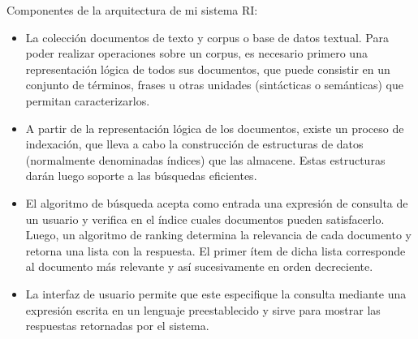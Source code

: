 \documentclass[11pt]{exam}
\begin{document}
\begin{questions}
Componentes de la arquitectura de mi sistema RI:

\begin{itemize}
	\item La colección documentos de texto y corpus o base de datos textual. Para poder realizar operaciones sobre un corpus, es necesario primero una representación lógica de todos sus documentos, que puede consistir en un conjunto de términos, frases u otras unidades (sintácticas o semánticas) que permitan caracterizarlos.
	\item A partir de la representación lógica de los documentos, existe un proceso de indexación, que lleva a cabo la construcción de estructuras de datos (normalmente denominadas índices) que las almacene. Estas estructuras darán luego soporte a las búsquedas eficientes.
	\item El algoritmo de búsqueda acepta como entrada una expresión de consulta de un usuario y verifica en el índice cuales documentos pueden satisfacerlo. Luego, un algoritmo de ranking determina la relevancia de cada documento y retorna una lista con la respuesta. El primer ítem de dicha lista corresponde al documento más relevante y así sucesivamente en orden decreciente.
	\item La interfaz de usuario permite que este especifique la consulta mediante una expresión escrita en un lenguaje preestablecido y sirve para mostrar las respuestas retornadas por el sistema.
\end{itemize}

\end{questions}
	
\end{document}
